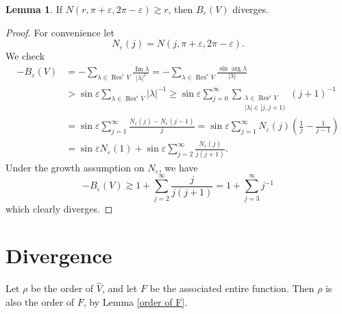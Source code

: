 \documentclass[12pt]{report}
\DeclareMathOperator{\Res}{Res}
\renewcommand{\Im}{\operatorname{Im}}
\theoremstyle{definition}
\newtheorem{lemma}[theorem]{Lemma}
\begin{document}
\begin{lemma}
\label{divergence of epsilon series}
If $N(r, \pi + \varepsilon, 2\pi - \varepsilon) \gtrsim r$, then $B_\varepsilon(V)$ diverges.
\end{lemma}
\begin{proof}
For convenience let
$$N_\varepsilon(j) = N(j, \pi + \varepsilon, 2\pi - \varepsilon).$$
We check
\begin{align*}
-B_\varepsilon(V) &= -\sum_{\lambda \in \Res^\varepsilon V} \frac{\Im \lambda}{|\lambda|^2} = -\sum_{\lambda \in \Res^\varepsilon V} \frac{\sin \arg \lambda}{|\lambda|}\\
  &> \sin \varepsilon \sum_{\lambda \in \Res^\varepsilon V} |\lambda|^{-1} \geq \sin \varepsilon \sum_{j=0}^\infty \sum_{\substack{\lambda \in \Res^\varepsilon V\\|\lambda| \in [j, j+1)}} (j+1)^{-1}\\
  &= \sin \varepsilon \sum_{j=1}^\infty \frac{N_\varepsilon(j) - N_\varepsilon(j-1)}{j} = \sin \varepsilon \sum_{j=1}^\infty N_\varepsilon(j)\left(\frac{1}{j} - \frac{1}{j-1}\right) \\
  &= \sin \varepsilon N_\varepsilon(1) + \sin \varepsilon \sum_{j=2}^\infty \frac{N_\varepsilon(j)}{j(j+1)}.
\end{align*}
Under the growth assumption on $N_\varepsilon$, we have
$$-B_\varepsilon(V) \gtrsim 1 + \sum_{j=2}^\infty \frac{j}{j(j+1)} = 1 + \sum_{j=3}^\infty j^{-1}$$
which clearly diverges.
\end{proof}


\section{Divergence}
Let $\rho$ be the order of $\hat V$, and let $F$ be the associated entire function. Then $\rho$ is also the order of $F$, by Lemma \ref{order of F}.
\end{document}
